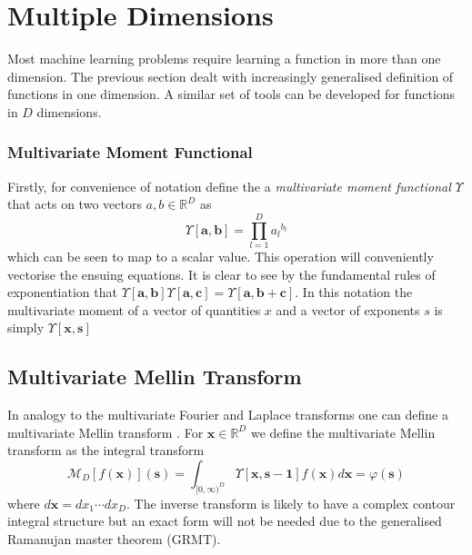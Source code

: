 \documentclass[journal=jcisd8,manuscript=article,layout=onecolumn,pdftex,floatfix,amsmath,amssymb,10pt]{achemso}
\begin{document}
\section{Multiple Dimensions}
Most machine learning problems require learning a function in more than one dimension. The previous section dealt with increasingly generalised definition of functions in one dimension. A similar set of tools can be developed for functions in $D$ dimensions. 

\subsubsection{Multivariate Moment Functional}
Firstly, for convenience of notation define the a \emph{multivariate moment functional} $\Upsilon$ that acts on two vectors $a,b \in \mathbb{R}^D$ as
\begin{equation}
\Upsilon[\mathbf{a},\mathbf{b}] = \prod_{l=1}^D {a_l}^{b_l}
\end{equation}
which can be seen to map to a scalar value. This operation will conveniently vectorise the ensuing equations. It is clear to see by the fundamental rules of exponentiation that $\Upsilon[\mathbf{a},\mathbf{b}]\Upsilon[\mathbf{a},\mathbf{c}] = \Upsilon[\mathbf{a},\mathbf{b+c}]$.  In this notation the multivariate moment of a vector of quantities $x$ and a vector of exponents $s$ is simply $\Upsilon[\mathbf{x},\mathbf{s}]$

\subsection{Multivariate Mellin Transform}
In analogy to the multivariate Fourier and Laplace transforms one can define a multivariate Mellin transform \cite{Laplace, Fourier, Mellin, Multivaraite Mellin}. For $\mathbf{x} \in \mathbb{R}^D$ we define the multivariate Mellin transform as the integral transform
\begin{equation}
\mathcal{M}_D[f(\mathbf{x})](\mathbf{s}) = \int_{[0,\infty)^D} \Upsilon[\mathbf{x},\mathbf{s-1}] f(\mathbf{x}) d \mathbf{x} = \varphi(\mathbf{s})
\end{equation}
where $d\mathbf{x} = dx_1 \cdots dx_D$. The inverse transform is likely to have a complex contour integral structure but an exact form will not be needed due to the generalised Ramanujan master theorem (GRMT).
\end{document}
